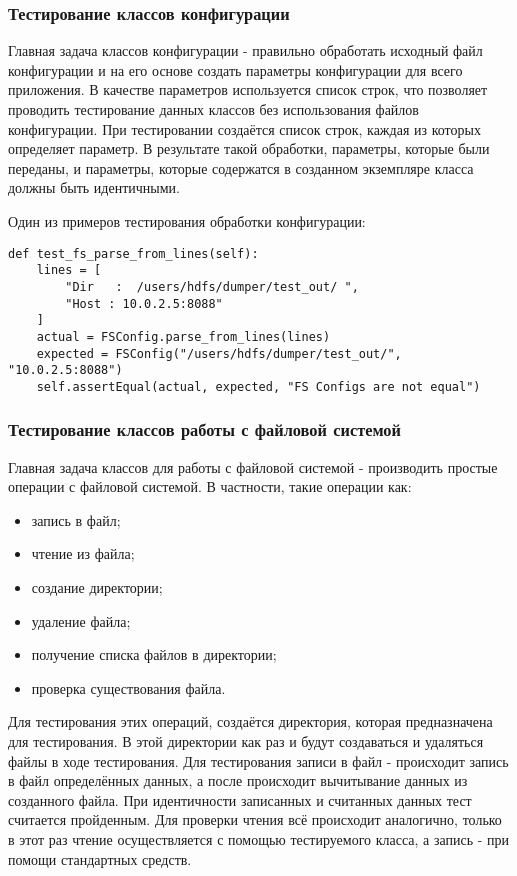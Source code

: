 \subsubsection{Тестирование классов конфигурации}

Главная задача классов конфигурации - правильно обработать исходный файл конфигурации и на его основе создать параметры конфигурации для всего приложения.
В качестве параметров используется список строк, что позволяет проводить тестирование данных классов без использования файлов конфигурации.
При тестировании создаётся список строк, каждая из которых определяет параметр.
В результате такой обработки, параметры, которые были переданы, и параметры, которые содержатся в созданном экземпляре класса должны быть идентичными.

Один из примеров тестирования обработки конфигурации:
\begin{lstlisting}
def test_fs_parse_from_lines(self):
    lines = [
        "Dir   :  /users/hdfs/dumper/test_out/ ",
        "Host : 10.0.2.5:8088"
    ]
    actual = FSConfig.parse_from_lines(lines)
    expected = FSConfig("/users/hdfs/dumper/test_out/", "10.0.2.5:8088")
    self.assertEqual(actual, expected, "FS Configs are not equal")
\end{lstlisting}

\subsubsection{Тестирование классов работы с файловой системой}

Главная задача классов для работы с файловой системой - производить простые операции с файловой системой.
В частности, такие операции как:
\begin{itemize}
    \item запись в файл;
    \item чтение из файла;
    \item создание директории;
    \item удаление файла;
    \item получение списка файлов в директории;
    \item проверка существования файла.
\end{itemize}

Для тестирования этих операций, создаётся директория, которая предназначена для тестирования.
В этой директории как раз и будут создаваться и удаляться файлы в ходе тестирования.
Для тестирования записи в файл - происходит запись в файл определённых данных, а после происходит вычитывание данных из созданного файла.
При идентичности записанных и считанных данных тест считается пройденным.
Для проверки чтения всё происходит аналогично, только в этот раз чтение осуществляется с помощью тестируемого класса, а запись - при помощи стандартных средств.

